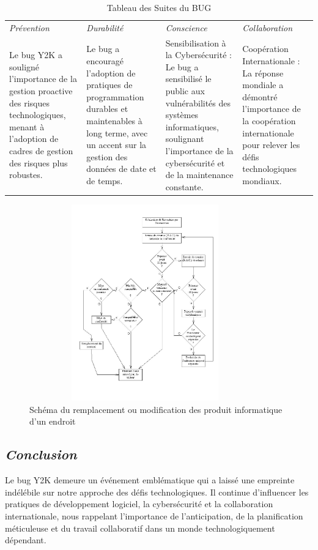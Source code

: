 \documentclass[12pt,a4paper]{article}
\begin{document}
\begin{table}[H]
\begin{tabular}{|p{3cm}|p{3cm}|p{3cm}|p{3cm}|}
\hline
\textit{\color{red}Prévention} & \textit{\color{red}Durabilité} & \textit{\color{red}Conscience} & \textit{\color{red}Collaboration} \\ \cline{1-4}
Le bug Y2K a souligné l'importance de la gestion proactive des risques technologiques, menant à l'adoption de cadres de gestion des risques plus robustes. & Le bug a encouragé l'adoption de pratiques de programmation durables et maintenables à long terme, avec un accent sur la gestion des données de date et de temps.& Sensibilisation à la Cybersécurité : Le bug a sensibilisé le public aux vulnérabilités des systèmes informatiques, soulignant l'importance de la cybersécurité et de la maintenance constante.&Coopération Internationale : La réponse mondiale a démontré l'importance de la coopération internationale pour relever les défis technologiques mondiaux.\\ \cline{1-4}
\end{tabular}
\caption{Tableau des Suites du BUG}
\end{table}

\begin{figure}[H]
    \centering
    \includegraphics[width=10cm, height=8.5cm]{./images/shema.JPG}
    \caption{Schéma du remplacement ou modification des produit informatique d'un endroit}  
\end{figure}


\newpage
\begin{center}

\section{\textit{Conclusion}}


Le bug Y2K demeure un événement emblématique qui a laissé une empreinte indélébile sur notre approche des défis technologiques. Il continue d'influencer les pratiques de développement logiciel, la cybersécurité et la collaboration internationale, nous rappelant l'importance de l'anticipation, de la planification méticuleuse et du travail collaboratif dans un monde technologiquement dépendant.

\end{center}
\end{document}
